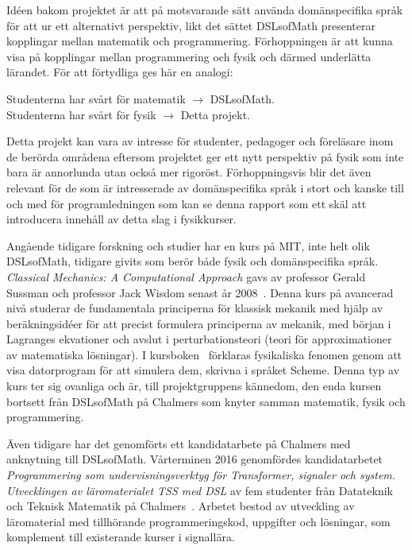 Idéen bakom projektet är att på motsvarande sätt använda domänspecifika språk för att ur ett alternativt perspektiv, likt det sättet DSLsofMath
presenterar kopplingar mellan matematik och programmering. Förhoppningen är att kunna visa på kopplingar mellan programmering och fysik och därmed
underlätta lärandet. För att förtydliga ges här en analogi:


\begin{center}
Studenterna har svårt för matematik $\rightarrow $ DSLsofMath.\\ 
Studenterna har svårt för fysik $\rightarrow $ Detta projekt.
\end{center}

Detta projekt kan vara av intresse för studenter, pedagoger och
föreläsare inom de berörda områdena eftersom projektet ger ett nytt
perspektiv på fysik som inte bara är annorlunda utan också mer rigoröst.
Förhoppningsvis blir det även relevant för de som är intresserade av
domänspecifika språk i stort och kanske till och med för programledningen som
kan se denna rapport som ett skäl att introducera innehåll av detta slag i
fysikkurser.

Angående tidigare forskning och studier har en kurs på MIT, inte helt olik
DSLsofMath, tidigare givits som berör både fysik och 
domänspecifika språk.
\textit{Classical Mechanics: A Computational Approach} gavs av professor Gerald Sussman
och professor Jack Wisdom senast år 2008~\cite{classical-mechanics-course-mit-2008}.
Denna kurs på avancerad nivå studerar de fundamentala principerna för klassisk
mekanik med hjälp av beräkningsidéer för att precist formulera principerna av
mekanik, med början i Lagranges ekvationer och avslut i perturbationsteori
(teori för approximationer av matematiska lösningar). I kursboken~\cite{SICM}
förklaras fysikaliska fenomen genom att visa datorprogram för att simulera dem,
skrivna i språket Scheme. Denna typ av kurs ter sig ovanliga och är, till
projektgruppens kännedom, den enda kursen bortsett från DSLsofMath på Chalmers som knyter
samman matematik, fysik och programmering.

Även tidigare har det genomförts ett kandidatarbete på Chalmers med anknytning till DSLsofMath.
Vårterminen 2016 genomfördes kandidatarbetet \textit{Programmering som
undervisningsverktyg för Transformer, signaler och system. Utvecklingen av
läromaterialet TSS med DSL} av fem studenter från Datateknik och Teknisk
Matematik på Chalmers~\cite{kandidat2016}. Arbetet bestod av utveckling av läromaterial med
tillhörande programmeringskod, uppgifter och lösningar, som komplement till
existerande kurser i signallära.

